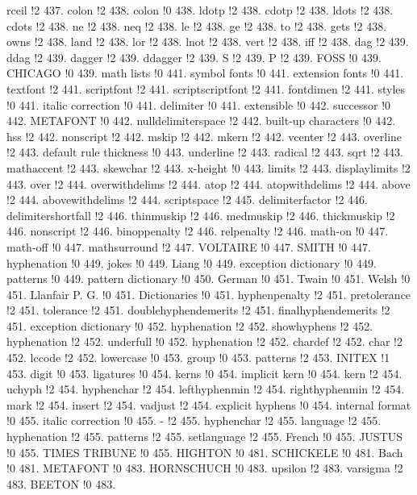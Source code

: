 rceil !2 437.
colon !2 438.
colon !0 438.
ldotp !2 438.
cdotp !2 438.
ldots !2 438.
cdots !2 438.
ne !2 438.
neq !2 438.
le !2 438.
ge !2 438.
to !2 438.
gets !2 438.
owns !2 438.
land !2 438.
lor !2 438.
lnot !2 438.
vert !2 438.
iff !2 438.
dag !2 439.
ddag !2 439.
dagger !2 439.
ddagger !2 439.
S !2 439.
P !2 439.
FOSS !0 439.
CHICAGO !0 439.
math lists !0 441.
symbol fonts !0 441.
extension fonts !0 441.
textfont !2 441.
scriptfont !2 441.
scriptscriptfont !2 441.
fontdimen !2 441.
styles !0 441.
italic correction !0 441.
delimiter !0 441.
extensible !0 442.
successor !0 442.
METAFONT !0 442.
nulldelimiterspace !2 442.
built-up characters !0 442.
hss !2 442.
nonscript !2 442.
mskip !2 442.
mkern !2 442.
vcenter !2 443.
overline !2 443.
default rule thickness !0 443.
underline !2 443.
radical !2 443.
sqrt !2 443.
mathaccent !2 443.
skewchar !2 443.
x-height !0 443.
limits !2 443.
displaylimits !2 443.
over !2 444.
overwithdelims !2 444.
atop !2 444.
atopwithdelims !2 444.
above !2 444.
abovewithdelims !2 444.
scriptspace !2 445.
delimiterfactor !2 446.
delimitershortfall !2 446.
thinmuskip !2 446.
medmuskip !2 446.
thickmuskip !2 446.
nonscript !2 446.
binoppenalty !2 446.
relpenalty !2 446.
math-on !0 447.
math-off !0 447.
mathsurround !2 447.
VOLTAIRE !0 447.
SMITH !0 447.
hyphenation !0 449.
jokes !0 449.
Liang !0 449.
exception dictionary !0 449.
patterns !0 449.
pattern dictionary !0 450.
German !0 451.
Twain !0 451.
Welsh !0 451.
Llanfair P. G. !0 451.
Dictionaries !0 451.
hyphenpenalty !2 451.
pretolerance !2 451.
tolerance !2 451.
doublehyphendemerits !2 451.
finalhyphendemerits !2 451.
exception dictionary !0 452.
hyphenation !2 452.
showhyphens !2 452.
hyphenation !2 452.
underfull !0 452.
hyphenation !2 452.
chardef !2 452.
char !2 452.
lccode !2 452.
lowercase !0 453.
group !0 453.
patterns !2 453.
INITEX !1 453.
digit !0 453.
ligatures !0 454.
kerns !0 454.
implicit kern !0 454.
kern !2 454.
uchyph !2 454.
hyphenchar !2 454.
lefthyphenmin !2 454.
righthyphenmin !2 454.
mark !2 454.
insert !2 454.
vadjust !2 454.
explicit hyphens !0 454.
internal format !0 455.
italic correction !0 455.
- !2 455.
hyphenchar !2 455.
language !2 455.
hyphenation !2 455.
patterns !2 455.
setlanguage !2 455.
French !0 455.
JUSTUS !0 455.
TIMES TRIBUNE !0 455.
HIGHTON !0 481.
SCHICKELE !0 481.
Bach !0 481.
METAFONT !0 483.
HORNSCHUCH !0 483.
upsilon !2 483.
varsigma !2 483.
BEETON !0 483.
